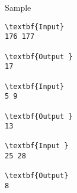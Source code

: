 Sample
\begin{verbatim}
\textbf{Input} 
176 177
 
\textbf{Output }
17 

\textbf{Input} 
5 9 
 
\textbf{Output } 
13 

\textbf{Input } 
25 28 
 
\textbf{Output}
8 

\end{verbatim}